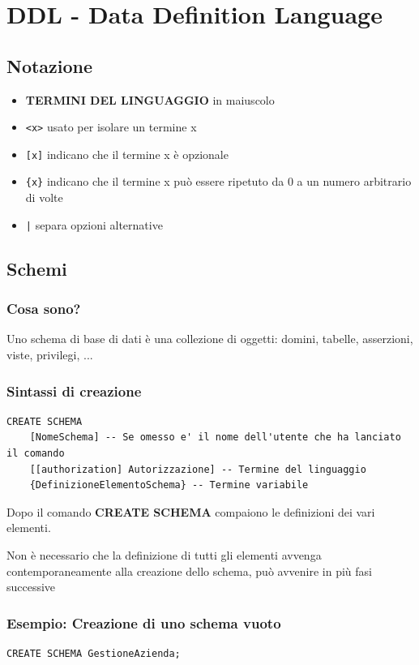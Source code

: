 \chapter{DDL - Data Definition Language}
\section{Notazione}
\begin{itemize}
    \item \textbf{TERMINI DEL LINGUAGGIO} in maiuscolo
    \item \texttt{<x>} usato per isolare un termine x
    \item \texttt{[x]} indicano che il termine x è opzionale
    \item \texttt{\{x\}} indicano che il termine x può essere ripetuto da 0 a un numero arbitrario di volte
    \item \texttt{|} separa opzioni alternative
\end{itemize}

\section{Schemi}
\subsection{Cosa sono?}
Uno schema di base di dati è una collezione di oggetti: domini, tabelle, asserzioni, viste, privilegi, ...

\subsection{Sintassi di creazione}
\begin{lstlisting}[language=sql_generic]
CREATE SCHEMA
    [NomeSchema] -- Se omesso e' il nome dell'utente che ha lanciato il comando
    [[authorization] Autorizzazione] -- Termine del linguaggio
    {DefinizioneElementoSchema} -- Termine variabile
\end{lstlisting}

Dopo il comando \textbf{CREATE SCHEMA} compaiono le definizioni dei vari elementi.

Non è necessario che la definizione di tutti gli elementi avvenga contemporaneamente alla creazione dello schema, può avvenire in più fasi successive

\subsection{Esempio: Creazione di uno schema vuoto}
\begin{lstlisting}[language=sql_generic]
    CREATE SCHEMA GestioneAzienda;
\end{lstlisting}

